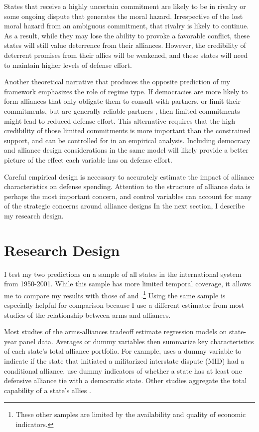 \documentclass[12pt]{article}
\begin{document}
States that receive a highly uncertain commitment are likely to be in rivalry or some ongoing dispute that generates the moral hazard. Irrespective of the lost moral hazard from an ambiguous commitment, that rivalry is likely to continue. As a result, while they may lose the ability to provoke a favorable conflict, these states will still value deterrence from their alliances. However, the credibility of deterrent promises from their allies will be weakened, and these states will need to maintain higher levels of defense effort.

Another theoretical narrative that produces the opposite prediction of my framework emphasizes the role of regime type. If democracies are more likely to form alliances that only obligate them to consult with partners, or limit their commitments, but are generally reliable partners \citep{Chibaetal2015, DigiuseppePoast2016}, then limited commitments might lead to reduced defense effort. This alternative requires that the high credibility of those limited commitments is more important than the constrained support, and can be controlled for in an empirical analysis. Including democracy and alliance design considerations in the same model will likely provide a better picture of the effect each variable has on defense effort. 

Careful empirical design is necessary to accurately estimate the impact of alliance characteristics on defense spending. Attention to the structure of alliance data is perhaps the most important concern, and control variables can account for many of the strategic concerns around alliance designs In the next section, I describe my research design. 
 

\section*{Research Design} 

I test my two predictions on a sample of all states in the international system from 1950-2001. While this sample has more limited temporal coverage, it allows me to compare my results with those of \citet{DigiuseppePoast2016} and \citet{Nordhausetal2012}.\footnote{These other samples are limited by the availability and quality of economic indicators.} Using the same sample is especially helpful for comparison because I use a different estimator from most studies of the relationship between arms and alliances. 

Most studies of the arms-alliances tradeoff estimate regression models on state-year panel data. Averages or dummy variables then summarize key characteristics of each state's total alliance portfolio. For example, \citet{Benson2012} uses a dummy variable to indicate if the state that initiated a militarized interstate dispute (MID) had a conditional alliance. \citet{DigiuseppePoast2016} use dummy indicators of whether a state has at least one defensive alliance tie with a democratic state. Other studies aggregate the total capability of a state's allies \citep{Nordhausetal2012}. 
\end{document}
